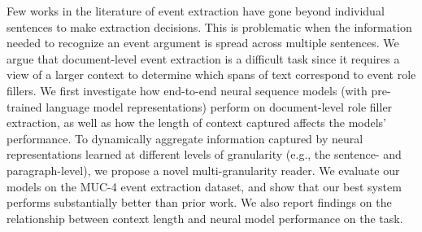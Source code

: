 Few works in the literature of event extraction have gone beyond individual sentences to make extraction decisions. This is problematic when the information needed to recognize an event argument is spread across multiple sentences. We argue that document-level event extraction is a difficult task since it requires a view of a larger context to determine which spans of text correspond to event role fillers. We first investigate how end-to-end neural sequence models (with pre-trained language model representations) perform on document-level role filler extraction, as well as how the length of context captured affects the models' performance. To dynamically aggregate information captured by neural representations learned at different levels of granularity (e.g., the sentence- and paragraph-level), we propose a novel multi-granularity reader. We evaluate our models on the MUC-4 event extraction dataset, and show that our best system performs substantially better than prior work. We also report findings on the relationship between context length and neural model performance on the task.

